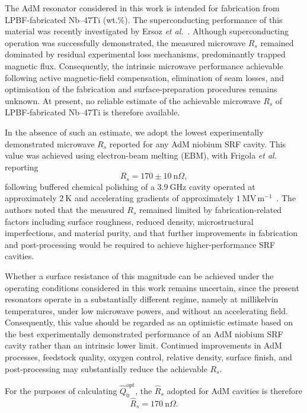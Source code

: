 \documentclass[
  aps,
  physrev,
  reprint,
  superscriptaddress,
  nofootinbib,
  amsmath,
  amssymb
]{revtex4-2}
\begin{document}
The AdM resonator considered in this work is intended for fabrication from LPBF-fabricated Nb--47Ti (wt.\%). The superconducting performance of this material was recently investigated by Ersoz \textit{et al.}~\cite{Ersoz2026}. Although superconducting operation was successfully demonstrated, the measured microwave $R_s$ remained dominated by residual experimental loss mechanisms, predominantly trapped magnetic flux. Consequently, the intrinsic microwave performance achievable following active magnetic-field compensation, elimination of seam losses, and optimisation of the fabrication and surface-preparation procedures remains unknown. At present, no reliable estimate of the achievable microwave $R_s$ of LPBF-fabricated Nb--47Ti is therefore available.

In the absence of such an estimate, we adopt the lowest experimentally demonstrated microwave $R_s$ reported for any AdM niobium SRF cavity. This value was achieved using electron-beam melting (EBM), with Frigola \textit{et al.} reporting
\begin{equation}
    R_s = 170 \pm 10~\mathrm{n}\Omega,
\end{equation}
following buffered chemical polishing of a $3.9~\mathrm{GHz}$ cavity operated at approximately $2~\mathrm{K}$ and accelerating gradients of approximately $1~\mathrm{MV\,m^{-1}}$~\cite{Frigola2015}. The authors noted that the measured $R_s$ remained limited by fabrication-related factors including surface roughness, reduced density, microstructural imperfections, and material purity, and that further improvements in fabrication and post-processing would be required to achieve higher-performance SRF cavities.

Whether a surface resistance of this magnitude can be achieved under the operating conditions considered in this work remains uncertain, since the present resonators operate in a substantially different regime, namely at millikelvin temperatures, under low microwave powers, and without an accelerating field. Consequently, this value should be regarded as an optimistic estimate based on the best experimentally demonstrated performance of an AdM niobium SRF cavity rather than an intrinsic lower limit. Continued improvements in AdM processes, feedstock quality, oxygen control, relative density, surface finish, and post-processing may substantially reduce the achievable $R_s$.

For the purposes of calculating $\hat Q_0^{\mathrm{opt}}$, the $\hat R_s$ adopted for AdM cavities is therefore
\begin{equation}
    \boxed{\hat{R}_s = 170~\mathrm{n}\Omega.}
\end{equation}
\end{document}
